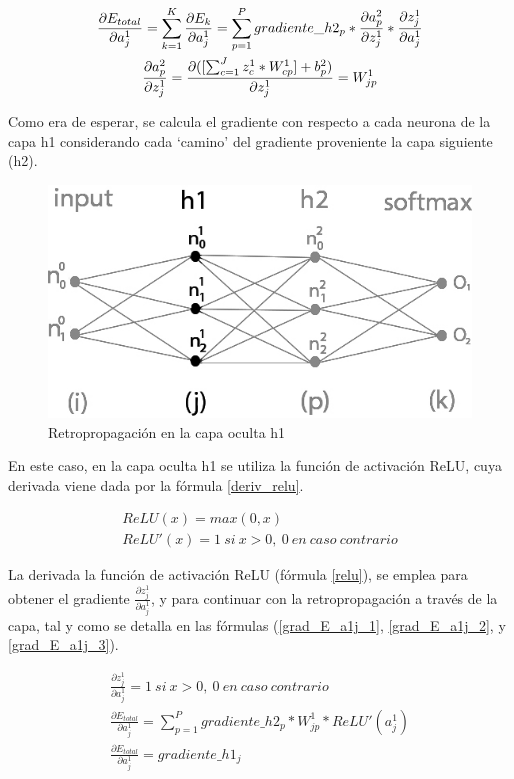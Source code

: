 \begin{gather}
	\frac{\partial E_{total}}{\partial a^1_j} = \sum_{k=1}^K \frac{\partial E_k}{\partial a^1_j} = \sum_{p=1}^P  gradiente\_h2_p * \frac{\partial a^2_p}{\partial z^1_j} * \frac{\partial z^1_j}{\partial a^1_j} \notag \\
	\frac{\partial a^2_p}{\partial z^1_j} = \frac{\partial( [\sum_{c=1}^{J} z^1_c * W^1_{cp}] + b^2_p)}{\partial z^1_j} = W^1_{jp} \notag
\end{gather}

Como era de esperar, se calcula el gradiente con respecto a cada neurona de la capa h1 considerando cada `camino' del gradiente proveniente la capa siguiente (h2).

\begin{figure}[H]
	\centering
	\includegraphics[scale=0.35]{imagenes/nn_2_capa_h1.jpg}  
	\caption{Retropropagación en la capa oculta h1}
\end{figure}

En este caso, en la capa oculta h1 se utiliza la función de activación ReLU, cuya derivada viene dada por la fórmula \ref{deriv_relu}. 

\begin{gather}
	ReLU(x) = max(0, x) \label{relu} \\
	ReLU'(x) = 1\ si\ x>0,\ 0\ en\ caso\ contrario
	\label{deriv_relu}
\end{gather}

La derivada la función de activación ReLU (fórmula \ref{relu}), se emplea para obtener el gradiente $\frac{\partial z^1_ j}{\partial a^1_j}$, y para continuar con la retropropagación a través de la capa, tal y como se detalla en las fórmulas (\ref{grad_E_a1j_1}, \ref{grad_E_a1j_2}, y \ref{grad_E_a1j_3}).


\begin{gather}
	\frac{\partial z^1_ j}{\partial a^1_j} = 1\ si\ x>0,\ 0\ en\ caso\ contrario \label{grad_E_a1j_1} \\
	\frac{\partial E_{total}}{\partial a^1_j} = \sum_{p=1}^P  gradiente\_h2_p * W^1_{jp} * ReLU'(a^1_j) \label{grad_E_a1j_2} \\
	\frac{\partial E_{total}}{\partial a^1_j} = gradiente\_h1_j
	\label{grad_E_a1j_3}
\end{gather}

